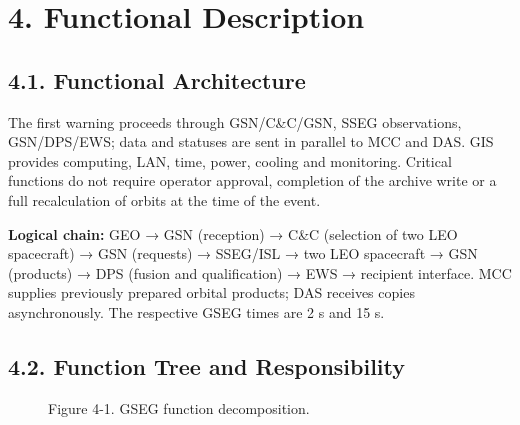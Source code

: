\section{4. Functional Description}\label{functional-description}

\subsection{4.1. Functional Architecture}\label{functional-architecture}

The first warning proceeds through GSN/\allowbreak{}C\&C/\allowbreak{}GSN, SSEG observations, GSN/\allowbreak{}DPS/\allowbreak{}EWS; data and statuses are sent in parallel to MCC and DAS. GIS provides computing, LAN, time, power, cooling and monitoring. Critical functions do not require operator approval, completion of the archive write or a full recalculation of orbits at the time of the event.

\textbf{Logical chain:} GEO → GSN (reception) → C\&C (selection of two LEO spacecraft) → GSN (requests) → SSEG/\allowbreak{}ISL → two LEO spacecraft → GSN (products) → DPS (fusion and qualification) → EWS → recipient interface. MCC supplies previously prepared orbital products; DAS receives copies asynchronously. The respective GSEG times are 2 s and 15 s.

\subsection{4.2. Function Tree and Responsibility}\label{function-tree}

\begin{figure}[H]
\centering

\caption{Figure 4-1. GSEG function decomposition.}
\end{figure}

